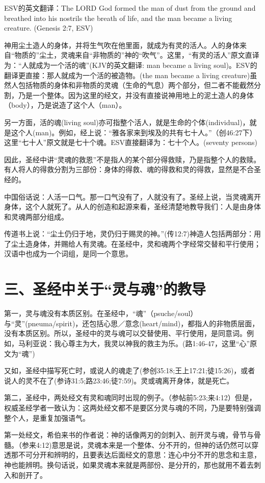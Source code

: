 ESV的英文翻译：The LORD God formed the man of dust from the ground and breathed into his nostrils the breath of life, and the man became a living creature. (Genesis 2:7, ESV)

神用尘土造人的身体，并将生气吹在他里面，就成为有灵的活人。人的身体来自“物质的”尘土，灵魂来自“非物质的”神的“吹气”。这里，“有灵的活人”原文直译为：“人就成为一个活的魂”(KJV的英文翻译: man became a living soul)。ESV的翻译更直接：那人就成为一个活的被造物。(the man became a living creature)虽然人包括物质的身体和非物质的灵魂（生命的气息）两个部分，但二者不能截然分割，乃是一个整体。因为这里的经文，并没有直接说神用地上的泥土造人的身体（body），乃是说造了这个人（man）。

另一方面，活的魂(living soul)亦可指整个活人，就是生命的个体(individual)，就是这个人(man)。例如，经上说：“雅各家来到埃及的共有七十人。”（创46:27下）这里“七十人”原文就是七十个魂。ESV直接翻译为：七十个人。(seventy persons)

因此，圣经中讲“灵魂的救恩”不是指人的某个部分得救赎，乃是指整个人的救赎。有人将人的得救分割为三部份：身体的得救、魂的得救和灵的得救，显然是不合圣经的。

中国俗话说：人活一口气。那一口气没有了，人就没有了。圣经上说，当灵魂离开身体，这个人就死了。从人的创造和起源来看，圣经清楚地教导我们：人是由身体和灵魂两部分组成。

传道书上说：“尘土仍归于地，灵仍归于赐灵的神。”(传12:7)神造人包括两部分：用了尘土造身体，并赐给人有灵魂。在圣经中，灵和魂两个字经常交替和平行使用；汉语中也成为一个词组，是同一个意思。

\section{三、圣经中关于“灵与魂”的教导}
第一，灵与魂没有本质区别。在圣经中，“魂”（psuche/soul）与“灵”(pneuma/spirit)，还包括心思／意念(heart/mind)，都指人的非物质层面，没有本质区别。所以，圣经中的灵与魂可以交替使用、平行使用，是同意词。例如，马利亚说：我心尊主为大，我灵以神我的救主为乐。(路1:46-47，这里“心”原文为“魂”)

又如，圣经中描写死亡时，或说人的魂走了(参创35:18;王上17:21;徒15:26)，或者说人的灵不在了(参诗31:5;路23:46;徒7:59)。灵或魂离开身体，就是死亡。

第二，圣经中，两处经文有灵和魂同时出现的例子。（参帖前5:23;来4:12）但是，权威圣经学者一致认为：这两处经文都不是要区分灵与魂的不同，乃是要特别强调整个人，是重复加强语气。

第一处经文，希伯来书的作者说：神的话像两刃的剑刺入、剖开灵与魂，骨节与骨髓。（参来4:12)意思是说，灵魂本来是一个整体、分不开的，但神的话仍然可以穿透那不可分开和辨明的，且要表达后面经文的意思：连心中分不开的思念和主意，神也能辨明。换句话说，如果灵魂本来就是两部份、是分开的，那也就用不着去刺入和剖开了。


